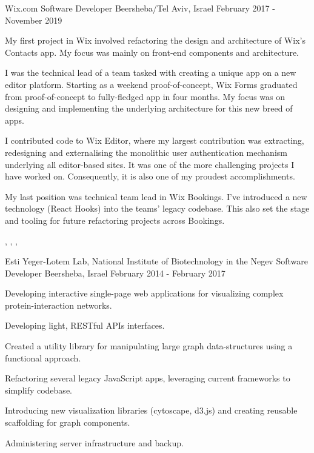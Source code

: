 
\begin{cventries}
  \cventry
    {Wix.com}
    {Software Developer}
    {Beersheba/Tel Aviv, Israel}
    {February 2017 - November 2019}
    {
      \begin{cvitems}
        \item {My first project in Wix involved refactoring the design and architecture of Wix’s Contacts app. My focus was mainly on front-end components and architecture.}
        \item {I was the technical lead of a team tasked with creating a unique app on a new editor platform. Starting as a weekend proof-of-concept, Wix Forms graduated from proof-of-concept to fully-fledged app in four months. My focus was on designing and implementing the underlying architecture for this new breed of apps.}
        \item {I contributed code to Wix Editor, where my largest contribution was extracting, redesigning and externalising the monolithic user authentication mechanism underlying all editor-based sites. It was one of the more challenging projects I have worked on. Consequently, it is also one of my proudest accomplishments.}
        \item {My last position was technical team lead in Wix Bookings. I've introduced a new technology (React Hooks) into the teams' legacy codebase. This also set the stage and tooling for future refactoring projects across Bookings.}
      \end{cvitems}
     }

    \begin{cvskills}
       {}
       {, , , }
    \end{cvskills}

  \cventry
    {Esti Yeger-Lotem Lab, National Institute of Biotechnology in the Negev}
    {Software Developer}
    {Beersheba, Israel}
    {February 2014 - February 2017}
    {
      \begin{cvitems}
        \item {Developing interactive single-page web applications for visualizing complex protein-interaction networks.}
        \item {Developing light, RESTful APIs interfaces.}
        \item {Created a utility library for manipulating large graph data-structures using a functional approach.}
        \item {Refactoring several legacy JavaScript apps, leveraging current frameworks to simplify codebase.}
        \item {Introducing new visualization libraries (cytoscape, d3.js) and creating reusable scaffolding for graph components.}
        \item {Administering server infrastructure and backup.}
      \end{cvitems}
    }
    

\end{cventries}
